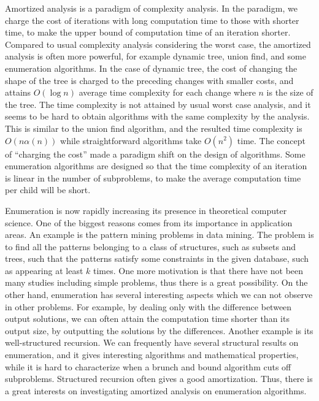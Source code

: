 \documentclass{llncs}
\begin{document}
Amortized analysis is a paradigm of complexity analysis.
In the paradigm, we charge the cost of iterations with long
 computation time to those with shorter time, to make the upper
 bound of computation time of an iteration shorter.
Compared to usual complexity analysis considering the worst case, 
 the amortized analysis is often more powerful, for example dynamic
 tree, union find, and some enumeration algorithms\cite{DynamicTree,UnionFind}.
In the case of dynamic tree, the cost of changing the shape of the tree
 is charged to the preceding changes with smaller costs, and
 attains $O(\log n)$ average time complexity for each
 change where $n$ is the size of the tree.
The time complexity is not attained by usual worst case analysis, 
 and it seems to be hard to obtain algorithms with the same
 complexity by the analysis.
This is similar to the union find algorithm, and the resulted 
 time complexity is $O(n\alpha(n))$ while straightforward algorithms
 take $O(n^2)$ time.
The concept of ``charging the cost'' made a paradigm shift on the 
 design of algorithms.
Some enumeration algorithms are designed so that the time complexity
 of an iteration is linear in the number of subproblems, to make the
 average computation time per child will be short\cite{KpRm95,SrTmUn97}.

Enumeration is now rapidly increasing its presence in theoretical 
 computer science.
One of the biggest reasons comes from its importance in application areas.
An example is the pattern mining problems in data mining.
The problem is to find all the patterns belonging to a class of structures,
 such as subsets and trees, such that the patterns satisfy some constraints
 in the given database, such as appearing at least $k$ times.
One more motivation is that there have not been many studies including
 simple problems, thus there is a great possibility.
On the other hand, enumeration has several interesting aspects which we can 
 not observe in other problems.
For example, by dealing only with the difference between output solutions,
 we can often attain the computation time shorter than its output size, by 
 outputting the solutions by the differences.
Another example is its well-structured recursion. 
We can frequently have several structural results on enumeration, and
 it gives interesting algorithms and mathematical properties, while 
 it is hard to characterize when a brunch and bound algorithm cuts off
 subproblems.
Structured recursion often gives a good amortization.
Thus, there is a great interests on investigating amortized analysis 
 on enumeration algorithms.
\end{document}
